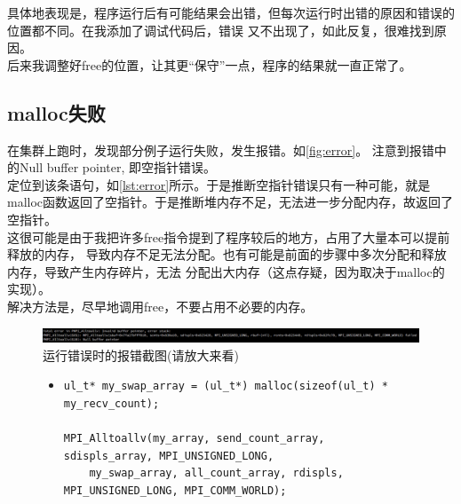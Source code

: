 \documentclass[a4paper]{article}
\begin{document}
具体地表现是，程序运行后有可能结果会出错，但每次运行时出错的原因和错误的位置都不同。在我添加了调试代码后，错误
又不出现了，如此反复，很难找到原因。\\

后来我调整好free的位置，让其更``保守''一点，程序的结果就一直正常了。\\

\subsection{malloc失败}
在集群上跑时，发现部分例子运行失败，发生报错。如\autoref{fig:error}。
注意到报错中的Null buffer pointer,
即空指针错误。\\

定位到该条语句，如\autoref{lst:error}所示。于是推断空指针错误只有一种可能，就是
malloc函数返回了空指针。于是推断堆内存不足，无法进一步分配内存，故返回了空指针。\\

这很可能是由于我把许多free指令提到了程序较后的地方，占用了大量本可以提前释放的内存，
导致内存不足无法分配。也有可能是前面的步骤中多次分配和释放内存，导致产生内存碎片，无法
分配出大内存（这点存疑，因为取决于malloc的实现）。\\

解决方法是，尽早地调用free，不要占用不必要的内存。
\begin{figure}[!hbt]
    \begin{center}
    \includegraphics[scale=0.3]{assets/error.png}
    \caption{运行错误时的报错截图(请放大来看)\label{fig:error}} 
    \end{center} 
\end{figure} 

\begin{figure}[!hbt]
\begin{itemize}
\item[] \begin{lstlisting}[style=mycpp, label=lst:error, caption=报错代码展示]
ul_t* my_swap_array = (ul_t*) malloc(sizeof(ul_t) * my_recv_count);

MPI_Alltoallv(my_array, send_count_array, sdispls_array, MPI_UNSIGNED_LONG,
    my_swap_array, all_count_array, rdispls, MPI_UNSIGNED_LONG, MPI_COMM_WORLD);
\end{lstlisting}
\end{itemize}
\end{figure}


\end{document}
